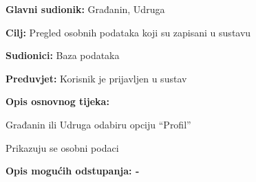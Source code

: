 								
				\noindent {}
					\begin{packed_item}
							
						\item \textbf{Glavni sudionik: }Građanin, Udruga
						\item  \textbf{Cilj:} Pregled osobnih podataka koji su zapisani u sustavu
						\item  \textbf{Sudionici:} Baza podataka
						\item  \textbf{Preduvjet:} Korisnik je prijavljen u sustav
						\item  \textbf{Opis osnovnog tijeka:}
						
						\item[] \begin{packed_enum}
							
							\item Građanin ili Udruga odabiru opciju “Profil”
							\item Prikazuju se osobni podaci
							\end{packed_enum}
						
						\item  \textbf{Opis mogućih odstupanja: -}
						\end{packed_item}
							
